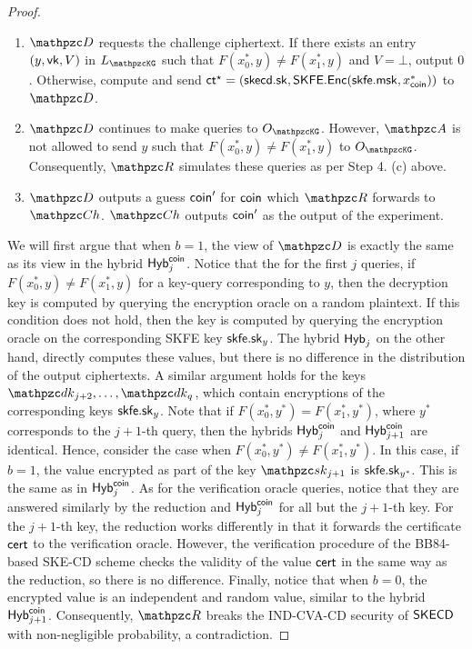 \begin{proof}
\begin{description}
\begin{enumerate}
\item $\qD$ requests the challenge ciphertext. If there exists
an entry $(y,\mathsf{vk},V)$ in $\List{\qKG}$ such that $F(x_0^*,y)\ne
F(x_1^*,y)$ and $V=\bot$, output $0$. Otherwise, compute and send $\mathsf{ct}^\star =
(\mathsf{skecd}.\mathsf{sk}, \mathsf{SKFE}.\mathsf{Enc}(\mathsf{skfe}.\mathsf{msk}, x^*_{\mathsf{coin}}))$ to $\qD$.

\item $\qD$ continues to make queries to $\Oracle{\qKG}$. However, $\qA$ is not allowed to send $y$ such that $F(x_0^*,y)\ne F(x_1^*,y)$ to $\Oracle{\qKG}$.
Consequently, $\qR$ simulates these queries as per Step 4. (c) above.

\item $\qD$ outputs a guess $\mathsf{coin}^\prime$ for $\mathsf{coin}$ which $\qR$
forwards to $\qCh$. $\qCh$ outputs $\mathsf{coin}^\prime$ as the output of the
experiment.
\end{enumerate}
\end{description}

We will first argue that when $b=1$, the view of $\qD$ is exactly the
same as its view in the hybrid $\mathsf{Hyb}_j^{\mathsf{coin}}$. Notice that the for the
first $j$ queries, if $F(x_0^*, y) \neq F(x_1^*, y)$ for a key-query
corresponding to $y$, then the decryption key is computed by querying
the encryption oracle on a random plaintext. If this condition does
not hold, then the key is computed by querying the encryption oracle
on the corresponding SKFE key $\mathsf{skfe}.\mathsf{sk}_y$. The hybrid $\mathsf{Hyb}_j$ on
the other hand, directly computes these values, but there is no
difference in the distribution of the output ciphertexts. A similar
argument holds for the keys $\qdk_{j+2}, \ldots, \qdk_q$, which
contain encryptions of the corresponding keys $\mathsf{skfe}.\mathsf{sk}_y$. Note
that if $F(x_0^*, y^*) = F(x_1^*, y^*)$, where $y^*$ corresponds to
the $j+1$-th query, then the hybrids $\mathsf{Hyb}_j^{\mathsf{coin}}$ and
$\mathsf{Hyb}_{j+1}^{\mathsf{coin}}$ are identical. Hence, consider the case when
$F(x_0^*, y^*) \neq F(x_1^*, y^*)$. In this case, if $b=1$,
the value encrypted as part of the key $\qsk_{j+1}$ is
$\mathsf{skfe}.\mathsf{sk}_{y^*}$. This is the same as in $\mathsf{Hyb}_j^{\mathsf{coin}}$. As for the
verification oracle queries, notice that they are answered similarly
by the reduction and $\mathsf{Hyb}_j^{\mathsf{coin}}$ for all but the $j+1$-th key. For
the $j+1$-th key, the reduction works differently in that it forwards
the certificate $\mathsf{cert}$ to the verification oracle.  However, the
verification procedure of the BB84-based SKE-CD scheme checks the
validity of the value $\mathsf{cert}$ in the same way as the reduction, so
there is no difference.
Finally, notice that when $b=0$, the encrypted value is an independent
and random value, similar to the hybrid $\mathsf{Hyb}_{j+1}^{\mathsf{coin}}$.
Consequently, $\qR$ breaks the IND-CVA-CD security of $\mathsf{SKECD}$ with
non-negligible probability, a contradiction.
\end{proof}

